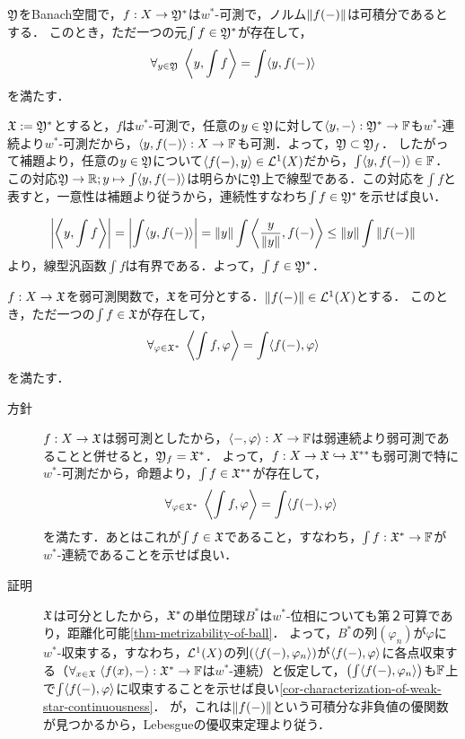 \documentclass[uplatex,dvipdfmx]{jsreport}
\begin{document}
\begin{proposition}
    $\mathfrak{Y}$をBanach空間で，$f:X\to\mathfrak{Y}^*$は$w^*$-可測で，ノルム$\|f(-)\|$は可積分であるとする．
    このとき，ただ一つの元$\int f\in\mathfrak{Y}^*$が存在して，
    \[\forall_{y\in\mathfrak{Y}}\;\left\langle y,\int f\right\rangle=\int\langle y,f(-)\rangle\]
    を満たす．
\end{proposition}
\begin{Proof}
    $\mathfrak{X}:=\mathfrak{Y}^*$とすると，$f$は$w^*$-可測で，任意の$y\in\mathfrak{Y}$に対して$\langle y,-\rangle:\mathfrak{Y}^*\to\mathbb{F}$も$w^*$-連続より$w^*$-可測だから，$\langle y,f(-)\rangle:X\to\mathbb{F}$も可測．よって，$\mathfrak{Y}\subset\mathfrak{Y}_f$．
    したがって補題より，任意の$y\in\mathfrak{Y}$について$\langle f(-),y\rangle\in\mathcal{L}^1(X)$だから，$\int\langle y,f(-)\rangle\in\mathbb{F}$．
    この対応$\mathfrak{Y}\to\mathbb{R};y\mapsto\int\langle y,f(-)\rangle$は明らかに$\mathfrak{Y}$上で線型である．この対応を$\int f$と表すと，一意性は補題より従うから，連続性すなわち$\int f\in\mathfrak{Y}^*$を示せば良い．

    \[\left|\left\langle y,\int f\right\rangle\right|=\left|\int\langle y,f(-)\rangle\right|=\|y\|\int\left\langle\frac{y}{\|y\|},f(-)\right\rangle\le\|y\|\int\|f(-)\|\]
    より，線型汎函数$\int f$は有界である．よって，$\int f\in\mathfrak{Y}^*$．
\end{Proof}

\begin{proposition}
    $f:X\to\mathfrak{X}$を弱可測関数で，$\mathfrak{X}$を可分とする．$\|f(-)\|\in\mathcal{L}^1(X)$とする．
    このとき，ただ一つの$\int f\in\mathfrak{X}$が存在して，
    \[\forall_{\varphi\in\mathfrak{X}^*}\;\left\langle\int f,\varphi\right\rangle=\int\langle f(-),\varphi\rangle\]
    を満たす．
\end{proposition}
\begin{Proof}\mbox{}
    \begin{description}
        \item[方針] $f:X\to\mathfrak{X}$は弱可測としたから，$\langle-,\varphi\rangle:X\to\mathbb{F}$は弱連続より弱可測であることと併せると，$\mathfrak{Y}_f=\mathfrak{X}^*$．
        よって，$f:X\to\mathfrak{X}\hookrightarrow\mathfrak{X}^{**}$も弱可測で特に$w^*$-可測だから，命題より，$\int f\in\mathfrak{X}^{**}$が存在して，
        \[\forall_{\varphi\in\mathfrak{X}^*}\;\left\langle\int f,\varphi\right\rangle=\int\langle f(-),\varphi\rangle\]
        を満たす．あとはこれが$\int f\in\mathfrak{X}$であること，すなわち，$\int f:\mathfrak{X}^*\to\mathbb{F}$が$w^*$-連続であることを示せば良い．
        \item[証明] 
        $\mathfrak{X}$は可分としたから，$\mathfrak{X}^*$の単位閉球$B^*$は$w^*$-位相についても第２可算であり，距離化可能\ref{thm-metrizability-of-ball}．
        よって，$B^*$の列$(\varphi_n)$が$\varphi$に$w^*$-収束する，すなわち，$\mathcal{L}^1(X)$の列$(\langle f(-),\varphi_n\rangle)$が$\langle f(-),\varphi\rangle$に各点収束する（$\forall_{x\in\mathfrak{X}}\;\langle f(x),-\rangle:\mathfrak{X}^*\to\mathbb{F}$は$w^*$-連続）と仮定して，$\left(\int\langle f(-),\varphi_n\rangle\right)$も$\mathbb{F}$上で$\int\langle f(-),\varphi\rangle$に収束することを示せば良い\ref{cor-characterization-of-weak-star-continuousness}．
        が，これは$\|f(-)\|$という可積分な非負値の優関数が見つかるから，Lebesgueの優収束定理より従う．
    \end{description}
\end{Proof}
\end{document}

